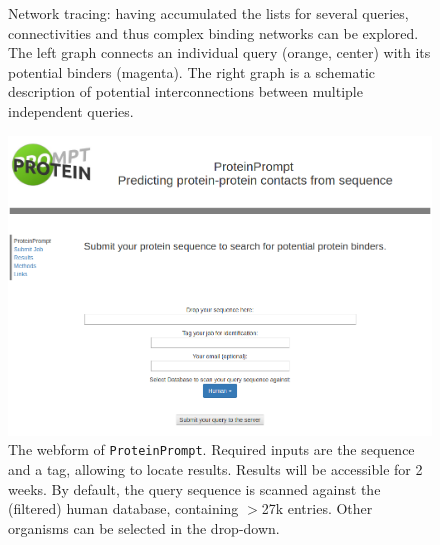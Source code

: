 \documentclass{article}
\newcommand{\tool}{\texttt{ProteinPrompt}}
\begin{document}
\begin{figure}
  
  \caption{Network tracing: having accumulated the lists for several queries, connectivities and thus complex binding networks can be explored.
   The left graph connects an individual query (orange, center) with its potential binders (magenta).
   The right graph is a schematic description of potential interconnections between multiple independent queries.}
  \label{fig:connect}
\end{figure}

\begin{figure}
  \hspace{-1.5cm}\includegraphics[width=1.2\linewidth]{material/webform.png}
  \caption{ The webform of \tool.
    Required inputs are the sequence and a tag, allowing to locate results.
    Results will be accessible for 2 weeks.
    By default, the query sequence is scanned against the (filtered) human database, containing $>$27k entries.
    Other organisms can be selected in the drop-down.}
  \label{fig:webform}
\end{figure}






\end{document}
